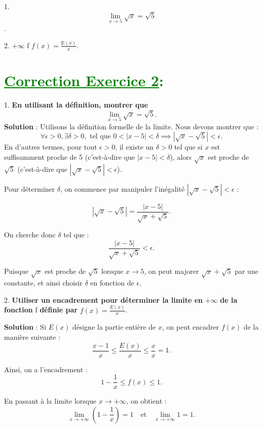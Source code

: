 \documentclass[12pt]{article}
\begin{document}
1.  
\[\lim_{x \to 5} \sqrt{x} = \sqrt{5}\].

2.  $+\infty$  f  $f(x) = \frac{\mathrm{E}(x)}{x}$.

\section*{\textcolor{green}{\underline{Correction Exercice 2}:}}

1. \textbf{En utilisant la définition, montrer que}
\[
\lim_{x \to 5} \sqrt{x} = \sqrt{5}.
\]
\textbf{Solution} : Utilisons la définition formelle de la limite. Nous devons montrer que :
\[
\forall \epsilon > 0, \exists \delta > 0, \text{ tel que } 0 < |x - 5| < \delta \implies |\sqrt{x} - \sqrt{5}| < \epsilon.
\]
En d'autres termes, pour tout \( \epsilon > 0 \), il existe un \( \delta > 0 \) tel que si \( x \) est suffisamment proche de 5 (c'est-à-dire que \( |x - 5| < \delta \)), alors \( \sqrt{x} \) est proche de \( \sqrt{5} \) (c'est-à-dire que \( |\sqrt{x} - \sqrt{5}| < \epsilon \)).

Pour déterminer \( \delta \), on commence par manipuler l'inégalité \( |\sqrt{x} - \sqrt{5}| < \epsilon \) :

\[
|\sqrt{x} - \sqrt{5}| = \frac{|x - 5|}{\sqrt{x} + \sqrt{5}}.
\]

On cherche donc \( \delta \) tel que :
\[
\frac{|x - 5|}{\sqrt{x} + \sqrt{5}} < \epsilon.
\]

Puisque \( \sqrt{x} \) est proche de \( \sqrt{5} \) lorsque \( x \to 5 \), on peut majorer \( \sqrt{x} + \sqrt{5} \) par une constante, et ainsi choisir \( \delta \) en fonction de \( \epsilon \).

2. \textbf{Utiliser un encadrement pour déterminer la limite en } $+\infty$ \textbf{ de la fonction } f \textbf{ définie par } $f(x) = \frac{E(x)}{x}$.

\textbf{Solution} : Si \( E(x) \) désigne la partie entière de \( x \), on peut encadrer \( f(x) \) de la manière suivante :
\[
\frac{x-1}{x} \leq \frac{E(x)}{x} \leq \frac{x}{x} = 1.
\]

Ainsi, on a l'encadrement :
\[
1 - \frac{1}{x} \leq f(x) \leq 1.
\]

En passant à la limite lorsque \(x \to +\infty\), on obtient :
\[
\lim_{x \to +\infty} \left( 1 - \frac{1}{x} \right) = 1 \quad \text{et} \quad \lim_{x \to +\infty} 1 = 1.
\]
\end{document}
